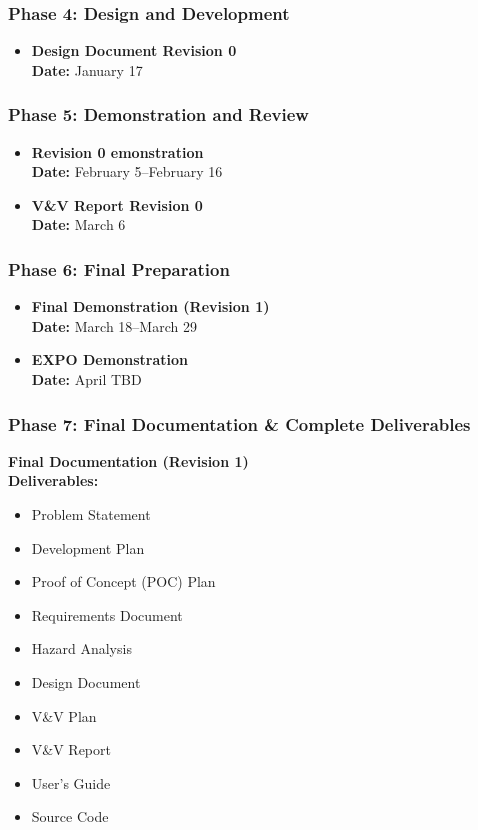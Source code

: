 \documentclass{article}
\begin{document}
\subsubsection*{Phase 4: Design and Development}
\begin{itemize}
    \item \textbf{Design Document Revision 0} \\
    \textbf{Date:} January 17
\end{itemize}

\subsubsection*{Phase 5: Demonstration and Review}
\begin{itemize}
    \item \textbf{Revision 0 emonstration} \\
    \textbf{Date:} February 5–February 16
    \item \textbf{V\&V Report Revision 0} \\
    \textbf{Date:} March 6
\end{itemize}

\subsubsection*{Phase 6: Final Preparation}
\begin{itemize}
    \item \textbf{Final Demonstration (Revision 1)} \\
    \textbf{Date:} March 18–March 29
    \item \textbf{EXPO Demonstration} \\
    \textbf{Date:} April TBD
\end{itemize}

\subsubsection*{Phase 7: Final Documentation \& Complete Deliverables}
\textbf{Final Documentation (Revision 1)} \\
\textbf{Deliverables:}
\begin{itemize}
    \item Problem Statement
    \item Development Plan
    \item Proof of Concept (POC) Plan
    \item Requirements Document
    \item Hazard Analysis
    \item Design Document
    \item V\&V Plan
    \item V\&V Report
    \item User’s Guide
    \item Source Code
\end{itemize}
\end{document}
